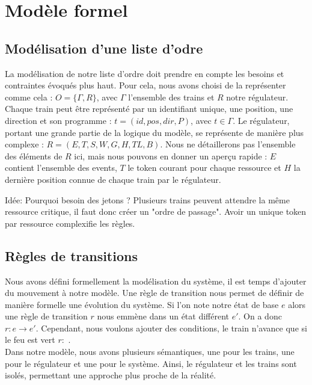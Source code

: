 \documentclass[runningheads]{llncs}
\begin{document}
\section{Modèle formel}
\label{sec:formal-model}


\subsection{Modélisation d'une liste d'odre}
La modélisation de notre liste d'ordre doit prendre en compte les besoins et contraintes évoqués plus haut.
Pour cela, nous avons choisi de la représenter comme cela : $O = \{\Gamma, R\}$, avec $\Gamma$ l'ensemble des trains et $R$ notre régulateur.
Chaque train peut être représenté par un identifiant unique, une position, une direction et son programme : $t = (id, pos, dir, P)$, avec $t \in \Gamma$.
Le régulateur, portant une grande partie de la logique du modèle, se représente de manière plus complexe : $R = (E,T,S,W,G,H,TL,B)$.
Nous ne détaillerons pas l'ensemble des éléments de $R$ ici, mais nous pouvons en donner un aperçu rapide : $E$ contient l'ensemble des events,
$T$ le token courant pour chaque ressource et $H$ la dernière position connue de chaque train par le régulateur.

Idée: Pourquoi besoin des jetons ? Plusieurs trains peuvent attendre la même ressource critique, il faut donc créer un "ordre de passage".
Avoir un unique token par ressource complexifie les règles.


\subsection{Règles de transitions}
Nous avons défini formellement la modélisation du système, il est temps d'ajouter du mouvement à notre modèle.
Une règle de transition nous permet de définir de manière formelle une évolution du système. 
Si l'on note notre état de base $e$ alors une règle de transition $r$ nous emmène dans un état différent $e'$. On a donc $r: e \rightarrow e'$.
Cependant, nous voulons ajouter des conditions, le train n'avance que si le feu est vert $r:$ .
\\Dans notre modèle, nous avons plusieurs sémantiques, une pour les trains, une pour le régulateur et une pour le système.
Ainsi, le régulateur et les trains sont isolés, permettant une approche plus proche de la réalité.
\end{document}
